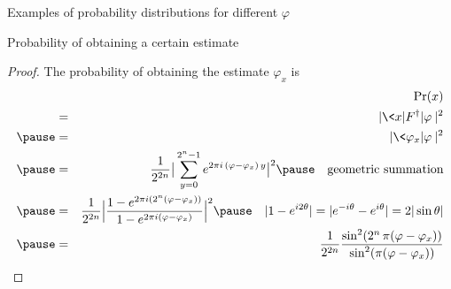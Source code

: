 

\begin{frame}{Examples of probability distributions for different $\varphi$}


\begin{center}
\end{center}

\end{frame}




\begin{frame}{Probability of obtaining a certain estimate}

\begin{proof}
The probability of obtaining the estimate $\varphi_x$ is 
\begin{eqnarray*}
&   & 
\Pr(x) \\
& = & 
|\< x| F^\dag |\varphi\> |^2 \\ \pause
& = & 
| \< \varphi_x| \varphi\> |^2 \\ \pause
& = &
\frac{1}{2^{2n}} 
\big|
\sum_{y = 0}^{2^n-1} e^{2 \pi i \, (\varphi -
\varphi_x) \, y }
\big|^2 \pause \quad \mbox{geometric summation} \\ \pause
& = &
\frac{1}{2^{2n}}
\Big|
\frac{1 - e^{2 \pi i (2^n (\varphi - \varphi_x))}}{1 -
e^{2 \pi i (\varphi - \varphi_x)}}
\Big|^2 \pause \quad |1 - e^{i 2\theta}| =| e^{-i \theta} -
e^{i\theta}| = 2|\sin\theta| \\ \pause
& = &
\frac{1}{2^{2n}}
\frac{\sin^2 (2^n\, \pi (\varphi - \varphi_x))}{\sin^2(\pi(\varphi - \varphi_x))}
\end{eqnarray*}
\end{proof}

\end{frame}




